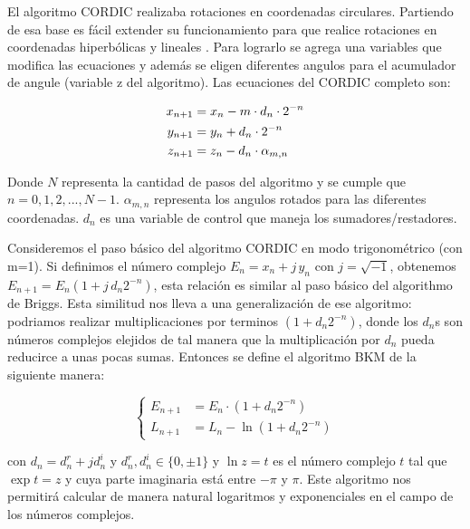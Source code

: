 \documentclass[a4paper]{article}
\begin{document}
El algoritmo CORDIC realizaba rotaciones en coordenadas circulares. Partiendo de esa base es fácil extender su funcionamiento para que realice rotaciones en coordenadas hiperbólicas y lineales \cite{Walther}. Para lograrlo se agrega una variables que modifica las ecuaciones y además se eligen diferentes angulos para el acumulador de angule (variable z del algoritmo).
Las ecuaciones del CORDIC completo son:

\begin{equation} \label{eq:cordic_eq}
   \begin{subequations}
      \begin{aligned}
         x_{n+1} &=  x_n - m \cdot d_n \cdot 2^{-n}   \\
         y_{n+1} &=  y_n + d_n \cdot 2^{-n}             \\
         z_{n+1} &=  z_n - d_n \cdot \alpha_{m,n}
      \end{aligned}
   \end{subequations}
\end{equation}

Donde $N$ representa la cantidad de pasos del algoritmo y se cumple que $n= 0, 1, 2, ... , N-1$. $\alpha_{m,n}$ representa los angulos rotados para las diferentes coordenadas. $d_n$ es una variable de control que maneja los sumadores/restadores.

   Consideremos el paso básico del algoritmo CORDIC en modo trigonométrico (con m=1).
   Si definimos el número complejo $E_n = x_n + j \, y_n$ con $j=\sqrt{-1}$, obtenemos $E_{n+1} = E_n (1+j \, d_n 2^{-n})$, esta relación es similar al paso básico del algorithmo de Briggs.
   Esta similitud nos lleva a una generalización de ese algoritmo: podriamos realizar multiplicaciones por terminos $(1+d_n 2^{-n})$, donde los $d_n$s son números complejos elejidos de tal manera que la multiplicación por $d_n$ pueda reducirce a unas pocas sumas.
   Entonces se define el algoritmo BKM de la siguiente manera:

\begin{equation} \label{eq:bkm_eqs}
   \left\{
      \begin{aligned}
         E_{n+1} &= E_n \cdot (1 + d_n 2^{-n})   \\
         L_{n+1} &= L_n - \ln(1 + d_n 2^{-n})
      \end{aligned}
   \right.
\end{equation}


   con $d_n = d_n^r + j d_n^i $ y $d_n^r, d_n^i \in \{ 0, \pm 1 \}$ y $\ln z = t$ es el número complejo $t$ tal que $\exp{t} = z$ y cuya parte imaginaria está entre $-\pi$ y $\pi$.
   Este algoritmo nos permitirá calcular de manera natural logaritmos y exponenciales en el campo de los números complejos.
\end{document}
